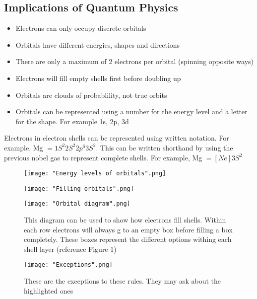 \documentclass[a4paper, 12pt]{article}
\begin{document}
		\subsection*{Implications of Quantum Physics}
			\begin{itemize}
				\item Electrons can only occupy discrete orbitals
				\item Orbitals have different energies, shapes and directions
				\item There are only a maximum of 2 electrons per orbital (spinning opposite ways)
				\item Electrons will fill empty shells first before doubling up
				\item Orbitals are clouds of probablility, not true orbits
				\item Orbitals can be represented using a number for the energy level and a letter for the shape. For example 1s, 2p, 3d 
			\end{itemize}
			
			Electrons in electron shells can be represented using written notation. For example, Mg $= 1S^2 2S^2 2p^6 3S^2$. This can be written shorthand by using the previous nobel gas to represent complete shells. For example, Mg $=[Ne] 3S^2$
			\newpage
			\clearpage
			
			\begin{figure}[!ht]
				\texttt{[image: "Energy levels of orbitals".png]}
				\caption{}
			\end{figure}

			\begin{figure}[!ht]
				\texttt{[image: "Filling orbitals".png]}
				\caption{}
			\end{figure}
			
			\begin{figure}[!ht]
				\texttt{[image: "Orbital diagram".png]}
				\caption{This diagram can be used to show how electrons fill shells. Within each row electrons will always g to an empty box before filling a box completely. These boxes represent the different options withing each shell layer (reference Figure 1)}
			\end{figure} 
			
			\begin{figure}[!ht]
				\texttt{[image: "Exceptions".png]}
				\caption{These are the exceptions to these rules. They may ask about the highlighted ones}
			\end{figure}
			
\end{document}
